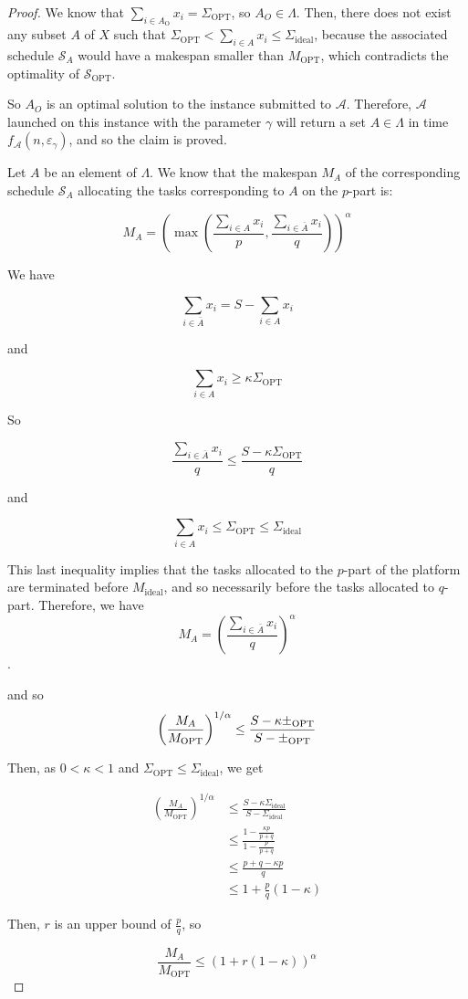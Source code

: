 \documentclass{llncs}
\newcommand{\newparskip}{\bigskip}
\newcommand{\s}{\mathcal S\xspace}
\newcommand{\sopt}{\ensuremath{\mathcal{S}_{\mathrm{OPT}}}\xspace}
\newcommand{\mopt}{\ensuremath{{M}_{\mathrm{OPT}}}\xspace}
\newcommand{\A}{\ensuremath{\mathcal A}\xspace}
\newcommand{\mideal}{\ensuremath{{M}_{\mathrm{ideal}}}\xspace}
\newcommand{\saideal}{\ensuremath{{\Sigma}_{\mathrm{ideal}}}\xspace}
\newcommand{\sa}{\ensuremath{\sum_{i\in A} x_i}}
\newcommand{\ao}{\ensuremath{A_{\mathrm{O}}}}
\newcommand{\sab}{\ensuremath{\sum_{i\in \bar A} x_i}}
\newcommand{\sao}{\ensuremath{\sum_{i\in \ao} x_i}}
\newcommand{\saopt}{\ensuremath{\mathcal{\Sigma}_{\mathrm{OPT}}}\xspace}
\newcommand{\puisa}[1]{\left(#1\right)^\alpha}
\newcommand{\eg}{\varepsilon_\gamma}
\begin{document}
\begin{proof}
We know that $\sao=\saopt$, so $A_O \in \Lambda$.
Then, there does not exist any subset $A$ of $X$ such that $\saopt < \sa \leq \saideal$, because the associated schedule $\s_A$ would have a makespan smaller than $\mopt$, which contradicts the optimality of $\sopt$.

So $A_O$ is an optimal solution to the instance submitted to $\A$.
Therefore, \A launched on this instance with the parameter $\gamma$ will return a set $A\in \Lambda$ in time $f_\A(n,\eg)$, and so the claim is proved.


\newparskip


Let $A$ be an element of $\Lambda$.
We know that the makespan $M_A$ of the corresponding schedule $\s_A$ allocating the tasks corresponding to $A$ on the $p$-part is:

$$M_A=\puisa{\max\left(\frac{\sa}{p}, \frac{\sab}{q}\right)}$$


We have

$$ \sab = S - \sa$$

and 

$$\sa \geq \kappa \saopt$$

So

$$\frac{\sab}{q} \leq \frac{ S- \kappa \saopt}{q}$$

and 

$$ \sa \leq \saopt \leq \saideal$$


This last inequality implies that the tasks allocated to the $p$-part of the platform are terminated before $\mideal$, and so necessarily before the tasks allocated to $q$-part. Therefore, we have $$M_A = \puisa{\frac{\sab}{q}}$$.

and so
$$
\left(\frac{M_A}{\mopt}\right)^{1/\alpha} 
\leq \frac{S-\kappa\saopt}{S-\saopt}\\ $$

Then, as $0<\kappa<1$ and $\saopt\leq\saideal$, we get

\begin{align*}
\left(\frac{M_A}{\mopt}\right)^{1/\alpha} 
&\leq \frac{S-\kappa\saideal}{S-\saideal}\\
&\leq \frac{1-\frac{\kappa p}{p+q}}{1-\frac{p}{p+q}}\\
&\leq \frac{p+q-\kappa p}{q}\\
&\leq 1 + \frac{p}{q} (1-\kappa)
\end{align*}

Then, $r$ is an upper bound of $\frac{p}{q}$, so

$$ \frac{M_A}{\mopt} \leq \puisa{1+ r\left(1-\kappa\right)}$$


\end{proof}
\end{document}
